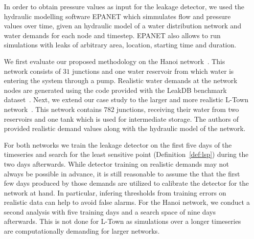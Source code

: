 In order to obtain pressure values as input for the leakage detector, we used the hydraulic modelling software EPANET \cite{epanet} which simmulates flow and pressure values over time, given an hydraulic model of a water distribution network and water demands for each node and timestep. EPANET also allows to run simulations with leaks of arbitrary area, location, starting time and duration.

We first evaluate our proposed methodology on the Hanoi network~\cite{hanoi}. This network consists of $31$ junctions and one water reservoir from which water is entering the system through a pump.
Realistic water demands at the network nodes are generated using the
code provided with the LeakDB benchmark dataset~\cite{leakDB}.
Next, we extend our case study to the larger and more realistic L-Town network~\cite{battledim}. This network contains $782$ junctions, receiving their water from two reservoirs and one tank which is used for intermediate storage. The authors of~\cite{battledim} provided realistic demand values along with the hydraulic model of the network.

For both networks we train the leakage detector on the first five days of the timeseries and search for the least sensitive point (Definition~\ref{def:lsp}) during the two days afterwards. While detector training on realistic demands may not always be possible in advance, it is still reasonable to assume the that the first few days produced by those demands are utilized to calibrate the detector for the network at hand. In particular, infering thresholds from training errors on realistic data can help to avoid false alarms.
For the Hanoi network, we conduct a second analysis with five training days and a search space of nine days afterwards. This is not done for L-Town as simulations over a longer timeseries are computationally demanding for larger networks.
